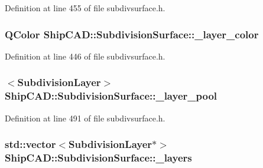 Definition at line 455 of file subdivsurface.\+h.

\subsubsection[{\texorpdfstring{\+\_\+layer\+\_\+color}{_layer_color}}]{\setlength{\rightskip}{0pt plus 5cm}Q\+Color Ship\+C\+A\+D\+::\+Subdivision\+Surface\+::\+\_\+layer\+\_\+color\hspace{0.3cm}{\ttfamily [protected]}}\hypertarget{classShipCAD_1_1SubdivisionSurface_a0833012e177dfd6cdb71174cb7baed17}{}\label{classShipCAD_1_1SubdivisionSurface_a0833012e177dfd6cdb71174cb7baed17}


Definition at line 446 of file subdivsurface.\+h.

\subsubsection[{\texorpdfstring{\+\_\+layer\+\_\+pool}{_layer_pool}}]{$<${\bf Subdivision\+Layer}$>$ Ship\+C\+A\+D\+::\+Subdivision\+Surface\+::\+\_\+layer\+\_\+pool\hspace{0.3cm}{\ttfamily [protected]}}\hypertarget{classShipCAD_1_1SubdivisionSurface_ad32ad62ece5a7a0b0268913e2b314969}{}\label{classShipCAD_1_1SubdivisionSurface_ad32ad62ece5a7a0b0268913e2b314969}


Definition at line 491 of file subdivsurface.\+h.

\subsubsection[{\texorpdfstring{\+\_\+layers}{_layers}}]{\setlength{\rightskip}{0pt plus 5cm}std\+::vector$<${\bf Subdivision\+Layer}$\ast$$>$ Ship\+C\+A\+D\+::\+Subdivision\+Surface\+::\+\_\+layers\hspace{0.3cm}{\ttfamily [protected]}}\hypertarget{classShipCAD_1_1SubdivisionSurface_a87c6c8b63f203d788b8f4b361c814c96}{}\label{classShipCAD_1_1SubdivisionSurface_a87c6c8b63f203d788b8f4b361c814c96}


